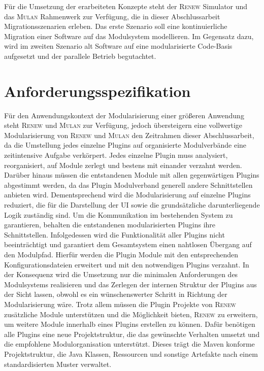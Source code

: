 	Für die Umsetzung der erarbeiteten Konzepte steht der \textsc{Renew} Simulator und das \textsc{Mulan} Rahmenwerk zur Verfügung, die in dieser Abschlussarbeit Migrationsszenarien erleben.\newline 
	Das erste Szenario soll eine kontinuierliche Migration einer Software auf das Modulsystem modellieren. Im Gegensatz dazu, wird im zweiten Szenario alt Software auf eine modularisierte Code-Basis aufgesetzt und der parallele Betrieb begutachtet.  

\section{Anforderungsspezifikation} 
	Für den Anwendungskontext der Modularisierung einer größeren Anwendung steht \textsc{Renew} und \textsc{Mulan} zur Verfügung, jedoch übersteigern eine vollwertige Modularisierung von \textsc{Renew} und \textsc{Mulan} den Zeitrahmen dieser Abschlussarbeit, da die Umstellung jedes einzelne Plugins auf organisierte Modulverbände eine zeitintensive Aufgabe verkörpert. Jedes einzelne Plugin muss analysiert, reorganisiert, auf Module zerlegt und bestens mit einander verzahnt werden. Darüber hinaus müssen die entstandenen Module mit allen gegenwärtigen Plugins abgestimmt werden, da das Plugin Modulverband generell andere Schnittstellen anbieten wird. \bigbreak
	Dementsprechend wird die Modularisierung auf einzelne Plugins reduziert, die für die Darstellung der UI sowie die grundsätzliche darunterliegende Logik zuständig sind. Um die Kommunikation im bestehenden System zu garantieren, behalten die entstandenen modularisierten Plugins ihre Schnittstellen. Infolgedessen wird die Funktionalität aller Plugins nicht beeinträchtigt und garantiert dem Gesamtsystem einen nahtlosen Übergang auf den Modulpfad. Hierfür werden die Plugin Module mit den entsprechenden Konfigurationsdateien erweitert und mit den notwendigen Plugins verzahnt. In der Konsequenz wird die Umsetzung nur die minimalen Anforderungen des Modulsystems realisieren und das Zerlegen der internen Struktur der Plugins aus der Sicht lassen, obwohl es ein wünschenswerter Schritt in Richtung der Modularisierung wäre. \newline 
	Trotz allem müssen die Plugin Projekte von \textsc{Renew} zusätzliche Module unterstützen und die Möglichkeit bieten, \textsc{Renew} zu erweitern, um weitere Module innerhalb eines Plugins erstellen zu können. Dafür benötigen alle Plugins eine neue Projektstruktur, die das gewünschte Verhalten umsetzt und die empfohlene Modulorganisation unterstützt. Dieses trägt die Maven konforme Projektstruktur, die Java Klassen, Ressourcen und sonstige Artefakte nach einem standardisierten Muster verwaltet.  \bigbreak

